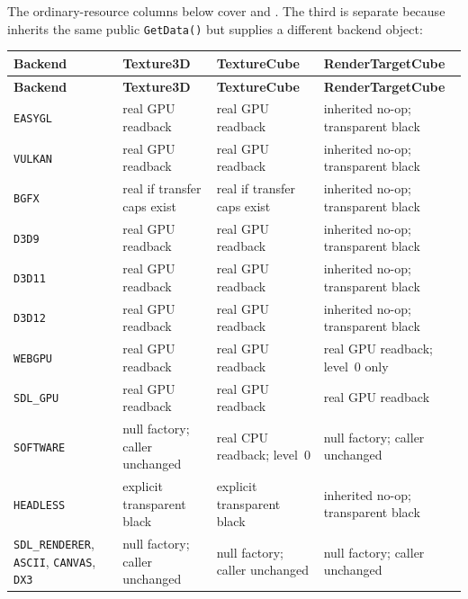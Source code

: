 The ordinary-resource columns below cover  and
. The third is separate because  inherits
the same public \texttt{GetData()} but supplies a different backend object:

\begingroup
\small
\setlength{\tabcolsep}{3.5pt}
\renewcommand{\arraystretch}{1.15}
\begin{longtable}{@{}p{}p{}p{}p{}@{}}
\toprule
\textbf{Backend} & \textbf{Texture3D} & \textbf{TextureCube} & \textbf{RenderTargetCube} \\
\midrule
\endfirsthead
\toprule
\textbf{Backend} & \textbf{Texture3D} & \textbf{TextureCube} & \textbf{RenderTargetCube} \\
\midrule
\endhead
\texttt{EASYGL}
  & real GPU readback & real GPU readback & inherited no-op; transparent black \\
\texttt{VULKAN}
  & real GPU readback & real GPU readback & inherited no-op; transparent black \\
\texttt{BGFX}
  & real if transfer caps exist & real if transfer caps exist
  & inherited no-op; transparent black \\
\texttt{D3D9}
  & real GPU readback & real GPU readback & inherited no-op; transparent black \\
\texttt{D3D11}
  & real GPU readback & real GPU readback & inherited no-op; transparent black \\
\texttt{D3D12}
  & real GPU readback & real GPU readback & inherited no-op; transparent black \\
\texttt{WEBGPU}
  & real GPU readback & real GPU readback & real GPU readback; level~0 only \\
\texttt{SDL\_GPU}
  & real GPU readback & real GPU readback & real GPU readback \\
\texttt{SOFTWARE}
  & null factory; caller unchanged & real CPU readback; level~0
  & null factory; caller unchanged \\
\texttt{HEADLESS}
  & explicit transparent black & explicit transparent black
  & inherited no-op; transparent black \\
\texttt{SDL\_RENDERER}, \texttt{ASCII}, \texttt{CANVAS}, \texttt{DX3}
  & null factory; caller unchanged & null factory; caller unchanged
  & null factory; caller unchanged \\
\bottomrule
\end{longtable}
\endgroup

